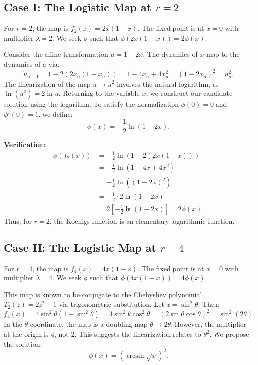 \documentclass[11pt, a4paper]{article}
\theoremstyle{definition}
\begin{document}
\subsection{Case I: The Logistic Map at $r=2$}
For $r=2$, the map is $f_2(x) = 2x(1-x)$. The fixed point is at $x=0$ with multiplier $\lambda = 2$.
We seek $\phi$ such that $\phi(2x(1-x)) = 2\phi(x)$.

Consider the affine transformation $u = 1-2x$. The dynamics of $x$ map to the dynamics of $u$ via:
\[
u_{n+1} = 1 - 2(2x_n(1-x_n)) = 1 - 4x_n + 4x_n^2 = (1-2x_n)^2 = u_n^2.
\]
The linearization of the map $u \to u^2$ involves the natural logarithm, as $\ln(u^2) = 2\ln u$.
Returning to the variable $x$, we construct our candidate solution using the logarithm. To satisfy the normalization $\phi(0)=0$ and $\phi'(0)=1$, we define:
\begin{equation}
\phi(x) = -\frac{1}{2} \ln(1-2x).
\end{equation}

\textbf{Verification:}
\begin{align*}
\phi(f_2(x)) &= -\frac{1}{2} \ln(1 - 2(2x(1-x))) \\
&= -\frac{1}{2} \ln(1 - 4x + 4x^2) \\
&= -\frac{1}{2} \ln((1-2x)^2) \\
&= -\frac{1}{2} \cdot 2 \ln(1-2x) \\
&= 2 \left[ -\frac{1}{2} \ln(1-2x) \right] = 2\phi(x).
\end{align*}
Thus, for $r=2$, the Koenigs function is an elementary logarithmic function.

\subsection{Case II: The Logistic Map at $r=4$}
For $r=4$, the map is $f_4(x) = 4x(1-x)$. The fixed point is at $x=0$ with multiplier $\lambda = 4$.
We seek $\phi$ such that $\phi(4x(1-x)) = 4\phi(x)$.

This map is known to be conjugate to the Chebyshev polynomial $T_2(z) = 2z^2-1$ via trigonometric substitution. Let $x = \sin^2 \theta$. Then:
\[
f_4(x) = 4\sin^2\theta(1-\sin^2\theta) = 4\sin^2\theta\cos^2\theta = (2\sin\theta\cos\theta)^2 = \sin^2(2\theta).
\]
In the $\theta$ coordinate, the map is a doubling map $\theta \to 2\theta$. However, the multiplier at the origin is $4$, not $2$. This suggests the linearization relates to $\theta^2$.
We propose the solution:
\begin{equation}
\phi(x) = \left( \arcsin \sqrt{x} \right)^2.
\end{equation}
\end{document}
